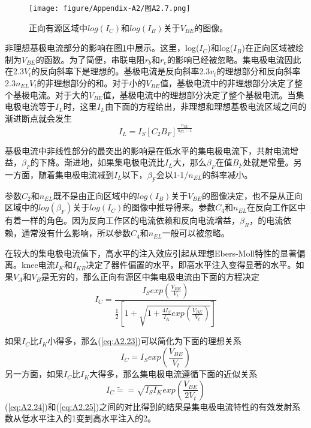 \begin{figure}[htbp]
\small
    \centering
    \texttt{[image: figure/Appendix-A2/图A2.7.png]}
    \caption{正向有源区域中$log(I_C)$和$log(I_B)$关于$V_{BE}$的图像。}
    \label{图A2.7}
\end{figure}

非理想基极电流部分的影响在图\ref{图A2.7}中展示。这里，log($I_C$)和log($I_B$)在正向区域被绘制为$V_{BE}$的函数。为了简便，串联电阻$r_b$和$r_e$的影响已经被忽略。集电极电流因此在2.3$V_t$的反向斜率下是理想的。基极电流是反向斜率2.3$v_t$的理想部分和反向斜率2.3$n_{EL}V_t$的非理想部分的和。对于小的$V_{BE}$值，基极电流中的非理想部分决定了整个基极电流。对于大的$V_{BE}$值，基极电流中的理想部分决定了整个基极电流。当集电极电流等于$I_L$时，这里$I_L$由下面的方程给出，非理想和理想基极电流区域之间的渐进断点就会发生
\begin{equation}
    I_L = I_S[C_2B_F]^{\frac{n_{EL}}{n_{EL}-1}}
    \label{eq:A2.22}
\end{equation}

基极电流中非线性部分的最突出的影响是在低水平的集电极电流下，共射电流增益，$\beta_F$的下降。渐进地，如果集电极电流比$I_L$大，那么$\beta_F$在值$B_F$处就是常量。另一方面，随着集电极电流减到$I_L$以下，$\beta_F$会以1-1/$n_{EL}$的斜率减小。

参数$C_2$和$n_{EL}$既不是由正向区域中的$log(I_B)$关于$V_{BE}$的图像决定，也不是从正向区域中的$log(\beta_F)$关于$log(I_C)$的图像中推导得来。参数$C_4$和$n_{EL}$在反向工作区中有着一样的角色。因为反向工作区的电流依赖和反向电流增益，$\beta_R$，的电流依赖，通常没有什么影响，所以参数$C_4$和$n_{EL}$一般可以被忽略。

在较大的集电极电流值下，高水平的注入效应引起从理想Ebers-Moll特性\cite{ref-86}的显著偏离。knee电流$I_K$和$I_{KR}$决定了器件偏置的水平，即高水平注入变得显著的水平。如果$V_A$和$V_B$是无穷的，那么正向有源区中集电极电流由下面的方程决定
\begin{equation}
    I_C = \frac{I_Sexp(\frac{V_{BE}}{V_t})}{\frac{1}{2}[1+\sqrt{1+\frac{4I_S}{I_K}exp(\frac{V_{BE}}{V_t})}]}
    \label{eq:A2.23}
\end{equation}

如果$I_C$比$I_K$小得多，那么(\ref{eq:A2.23})可以简化为下面的理想关系
\begin{equation}
    I_C = I_Sexp(\frac{V_{BE}}{V_t})
    \label{eq:A2.24}
\end{equation}
另一方面，如果$I_C$比$I_K$大得多，那么集电极电流遵循下面的近似关系
\begin{equation}
    I_C \widetilde{=} = \sqrt{I_SI_K}exp(\frac{V_{BE}}{2V_t})
    \label{eq:A2.25}
\end{equation}
(\ref{eq:A2.24})和(\ref{eq:A2.25})之间的对比得到的结果是集电极电流特性的有效发射系数从低水平注入的1变到高水平注入的2\cite{ref-86}。

